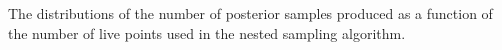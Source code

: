 \label{fig:numposts}
The distributions of the number of posterior samples produced as a function of the number of live points used in the nested sampling algorithm.

